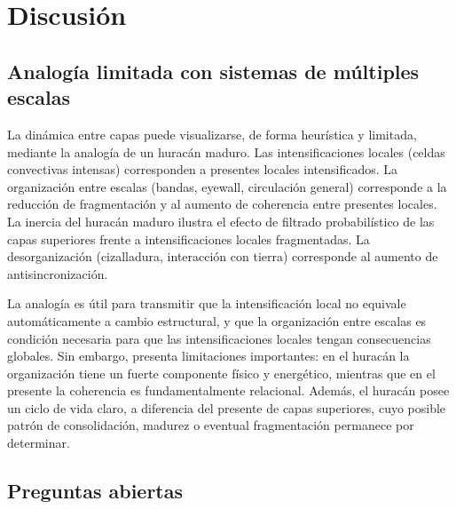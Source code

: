 \section{Discusión}

\subsection{Analogía limitada con sistemas de múltiples escalas}

La dinámica entre capas puede visualizarse, de forma heurística y limitada, mediante la analogía de un huracán maduro. Las intensificaciones locales (celdas convectivas intensas) corresponden a presentes locales intensificados. La organización entre escalas (bandas, eyewall, circulación general) corresponde a la reducción de fragmentación y al aumento de coherencia entre presentes locales. La inercia del huracán maduro ilustra el efecto de filtrado probabilístico de las capas superiores frente a intensificaciones locales fragmentadas. La desorganización (cizalladura, interacción con tierra) corresponde al aumento de antisincronización.

La analogía es útil para transmitir que la intensificación local no equivale automáticamente a cambio estructural, y que la organización entre escalas es condición necesaria para que las intensificaciones locales tengan consecuencias globales. Sin embargo, presenta limitaciones importantes: en el huracán la organización tiene un fuerte componente físico y energético, mientras que en el presente la coherencia es fundamentalmente relacional. Además, el huracán posee un ciclo de vida claro, a diferencia del presente de capas superiores, cuyo posible patrón de consolidación, madurez o eventual fragmentación permanece por determinar.

\subsection{Preguntas abiertas}

